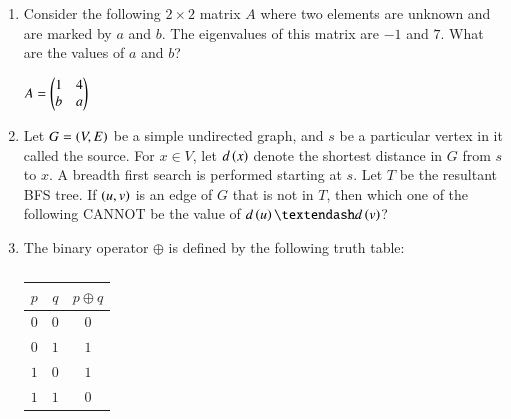 \documentclass[journal,12pt,onecolumn]{IEEEtran}
\theoremstyle{remark}
\begin{document}
\begin{enumerate}[resume]
		\item Consider the following $2 \times 2$ matrix $A$ where two elements are unknown and are marked by $a$ and $b$. The eigenvalues of this matrix are $-1$ and $7$. What are the values of $a$ and $b$?
		
		$A = \begin{pmatrix}1 & 4 \\ b & a\end{pmatrix}$
		
		\hfill{}
		
		\begin{enumerate}
		\end{enumerate}
		
		\item Let $G = \left(V, E\right)$ be a simple undirected graph, and $s$ be a particular vertex in it called the source. For $x \in V$, let $d\left(x\right)$ denote the shortest distance in $G$ from $s$ to $x$. A breadth first search  is performed starting at $s$. Let $T$ be the resultant BFS tree. If $\left(u, v\right)$ is an edge of $G$ that is not in $T$, then which one of the following CANNOT be the value of $d\brak{u} – d\brak{v}$?
		
		\hfill{\brak{\text{GATE CS 2015}}}
		
		\begin{enumerate}
			\begin{multicols}{4}
				\item $–1$
				\item $0$
				\item $1$
				\item $2$
			\end{multicols}
		\end{enumerate}
		
		\item The binary operator $\oplus$ is defined by the following truth table:
		
		\begin{table}[h]
			\caption*{}
			\label{tab:truth_table}
			\begin{center}
				\begin{tabular}{|c|c|c|}
					\hline
					$p$ & $q$ & $p \oplus q$ \\
					\hline
					$0$ & $0$ & $0$ \\
					$0$ & $1$ & $1$ \\
					$1$ & $0$ & $1$ \\
					$1$ & $1$ & $0$ \\
					\hline
				\end{tabular}
			\end{center}
		\end{table}
		

\end{enumerate}
\end{document}
